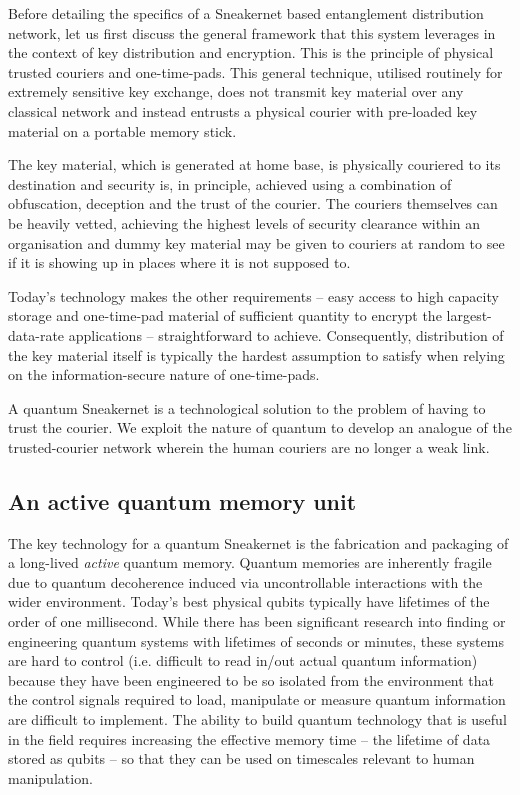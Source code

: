 \documentclass[twocolumn, aps, rmp, amsmath, amssymb, nofootinbib, superscriptaddress, longbibliography, floatfix, table-of-contents, eqsecnum]{revtex4-2}
\begin{document}
Before detailing the specifics of a Sneakernet based entanglement distribution network, let us first discuss the general framework that this system leverages in the context of key distribution and encryption. This is the principle of physical trusted couriers and one-time-pads. This general technique, utilised routinely for extremely sensitive key exchange, does not transmit key material over any classical network and instead entrusts a physical courier with pre-loaded key material on a portable memory stick. 

The key material, which is generated at home base, is physically couriered to its destination and security is, in principle, achieved using a combination of obfuscation, deception and the trust of the courier. The couriers themselves can be heavily vetted, achieving the highest levels of security clearance within an organisation and dummy key material may be given to couriers at random to see if it is showing up in places where it is not supposed to. 

Today's technology makes the other requirements -- easy access to high capacity storage and one-time-pad material of sufficient quantity to encrypt the largest-data-rate applications -- straightforward to achieve. Consequently, distribution of the key material itself is typically the hardest assumption to satisfy when relying on the information-secure nature of one-time-pads.

A quantum Sneakernet is a technological solution to the problem of having to trust the courier. We exploit the nature of quantum to develop an analogue of the trusted-courier network wherein the human couriers are no longer a weak link. 

\subsection{An active quantum memory unit}

The key technology for a quantum Sneakernet is the fabrication and packaging of a long-lived \textit{active} quantum memory. Quantum memories are inherently fragile due to quantum decoherence induced via uncontrollable interactions with the wider environment. Today's best physical qubits typically have lifetimes of the order of one millisecond. While there has been significant research into finding or engineering quantum systems with lifetimes of seconds or minutes, these systems are hard to control (i.e. difficult to read in/out actual quantum information) because they have been engineered to be so isolated from the environment that the control signals required to load, manipulate or measure quantum information are difficult to implement. The ability to build quantum technology that is useful in the field requires increasing the effective memory time -- the lifetime of data stored as qubits -- so that they can be used on timescales relevant to human manipulation. 
\end{document}
